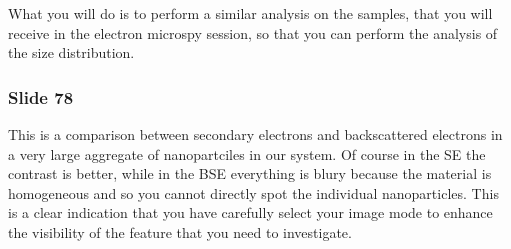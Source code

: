 \documentclass[../main/main.tex]{subfiles}
\begin{document}
What you will do is to perform a similar analysis on the samples, that you will receive in the electron microspy session, so that you can perform the analysis of the size distribution.

\subsubsection{Slide 78}
This is a comparison between secondary electrons and backscattered electrons in a very large aggregate of nanopartciles in our system. Of course in the SE the contrast is better, while in the BSE everything is blury because the material is homogeneous and so you cannot directly spot the individual nanoparticles.
This is a clear indication that you have carefully select your image mode to enhance the visibility of the feature that you need to investigate.
\end{document}
